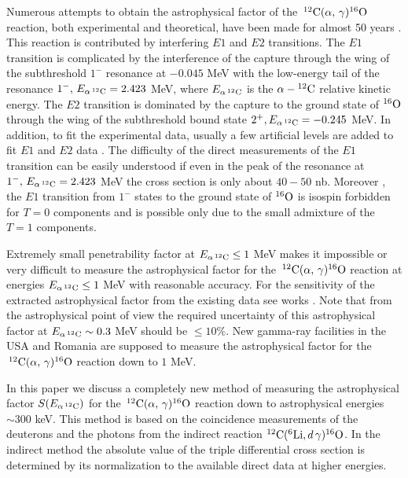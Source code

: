 \documentclass[prl,unsortedaddress,groupedaddress,twocolumn,amsmath,amsfonts,amssymb,showpacs,floatfix,nofootinbib]{revtex4}
\begin{document}
Numerous attempts to obtain the astrophysical factor of the $\,{}^{12}{\rm C}(\alpha,\,\gamma){}^{16}{\rm O}$ reaction, both experimental and theoretical, have been made for almost 50 years \cite{redder,barker78,barker87,barkerkajino,azuma,brune1999,kunz,assuncao,Schuermann,gai2015,sayre,gai2013,brune2013,gai2014,avila}. This reaction is contributed by interfering $E1$ and $E2$ transitions. 
The $E1$ transition is complicated by the interference of the capture through the wing of the subthreshold $1^{-}$ resonance at $-0.045$ MeV with the low-energy tail  of the resonance  $1^{-},\,E_{\alpha\,{}^{12}{\rm C}}=2.423$ MeV, where $E_{\alpha\,{}^{12}{\rm C}}$ is the $\alpha-{}^{12}{\rm C}$ relative kinetic energy. The $E2$ transition is dominated by the capture to the ground state of ${}^{16}{\rm O}$ through the wing of the subthreshold  bound state $2^{+},E_{\alpha\,{}^{12}{\rm C}}=-0.245$ MeV.  In addition, to fit the experimental data, usually
a few artificial levels are added to fit $E1$ and $E2$ data \cite{barkerkajino,brune1999}. The difficulty of the direct measurements of the $E1$ transition can be easily understood if even in the peak of the resonance at
$1^{-},\,E_{\alpha\,{}^{12}{\rm C}}=2.423$ MeV the cross section is only about $40-50$ nb. Moreover , the $E1$ transition from $1^{-}$ states to the ground state of ${}^{16}{\rm O}$ is isospin forbidden for $T=0$ components and is possible only due to the small admixture of the $T=1$ components.

Extremely small penetrability factor at  $E_{\alpha\,{}^{12}{\rm C}} \leq 1$ MeV makes it impossible or very difficult to measure the astrophysical factor for the $\,{}^{12}{\rm C}(\alpha,\,\gamma){}^{16}{\rm O}$ reaction at energies $E_{\alpha\,{}^{12}{\rm C}} \leq  1$ MeV  with reasonable accuracy. For the sensitivity of the extracted  astrophysical factor from the existing data see  works \cite{gai2013,gai2014,gai2015}. Note that from the astrophysical point of view  the required uncertainty  of this astrophysical factor at $E_{\alpha\,{}^{12}{\rm C}} \sim 0.3$ MeV should be $\leq 10\%$. New gamma-ray facilities in the USA and Romania are supposed to measure the astrophysical factor for the $\,{}^{12}{\rm C}(\alpha,\,\gamma){}^{16}{\rm O}$ reaction down to $1$ MeV.

In this paper we discuss a completely new method of measuring the astrophysical factor $S(E_{\alpha\,{}^{12}{\rm C}})$ for the $\,{}^{12}{\rm C}(\alpha,\,\gamma){}^{16}{\rm O}$ reaction down to astrophysical energies $\sim 300$ keV. This method is based on the coincidence measurements of the deuterons and the photons from the indirect reaction ${}^{12}{\rm C}({}^{6}{\rm Li},d\,\gamma){}^{16}{\rm O}$. In the indirect method the absolute value of the triple differential cross section is determined by its normalization to the available direct data at higher energies.
\end{document}
